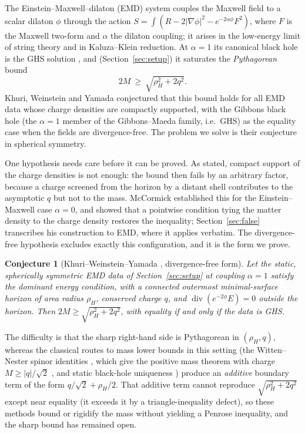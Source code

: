 \documentclass[11pt]{article}
\theoremstyle{plain}
\newtheorem{conjecture}[theorem]{Conjecture}
\theoremstyle{definition}
\newcommand{\rH}{\rho_{\!H}}
\begin{document}
The Einstein--Maxwell--dilaton (EMD) system couples the Maxwell field to a scalar dilaton $\phi$ through the
action $S=\int(R-2|\nabla\phi|^2-e^{-2\alpha\phi}F^2)$, where $F$ is the Maxwell two-form and $\alpha$ the
dilaton coupling; it arises in the low-energy limit of string theory and in Kaluza--Klein reduction. At
$\alpha=1$ its canonical black hole is the GHS solution \cite{GHS,GibbonsMaeda}, and (Section~\ref{sec:setup})
it saturates the \emph{Pythagorean} bound
\begin{equation*}
  2M\ \ge\ \sqrt{\rH^2+2q^2}.
\end{equation*}
Khuri, Weinstein and Yamada \cite[Conjecture 1.7]{KWYext} conjectured that this bound holds for all EMD data
whose charge densities are compactly supported, with the Gibbons black hole \cite{Gibbons82} (the $\alpha=1$
member of the Gibbons--Maeda family, i.e.\ GHS) as the equality case when the fields are divergence-free. The
problem we solve is their conjecture in spherical symmetry.

One hypothesis needs care before it can be proved. As stated, compact support of the charge densities is not
enough: the bound then fails by an arbitrary factor, because a charge screened from the horizon by a distant
shell contributes to the asymptotic $q$ but not to the mass. McCormick \cite[Theorem 3.3]{McCormick}
established this for the Einstein--Maxwell case $\alpha=0$, and showed that a pointwise condition tying the
matter density to the charge density restores the inequality; Section~\ref{sec:false} transcribes his
construction to EMD, where it applies verbatim. The divergence-free hypothesis excludes exactly this
configuration, and it is the form we prove.

\begin{conjecture}[Khuri--Weinstein--Yamada \cite{KWYext}, divergence-free form]\label{conj:posed}
Let the static, spherically symmetric EMD data of Section~\textup{\ref{sec:setup}} at coupling $\alpha=1$
satisfy the dominant energy condition, with a connected outermost minimal-surface horizon of area radius
$\rH$, conserved charge $q$, and $\operatorname{div}(e^{-2\phi}E)=0$ outside the horizon. Then
$2M\ge\sqrt{\rH^2+2q^2}$, with equality if and only if the data is GHS.
\end{conjecture}

The difficulty is that the sharp right-hand side is Pythagorean in $(\rH,q)$, whereas the classical routes to
mass lower bounds in this setting (the Witten--Nester spinor identities \cite{Witten}, which give the positive
mass theorem with charge $M\ge|q|/\sqrt2$ \cite{GKLTT,Nozawa,Rogatko,NozawaShiromizu}, and static black-hole uniqueness
\cite{MarsSimon}) produce an \emph{additive} boundary term of the form $q/\sqrt2+\rH/2$. That additive term
cannot reproduce $\sqrt{\rH^2+2q^2}$ except near equality (it exceeds it by a triangle-inequality defect),
so these methods bound or rigidify the mass without yielding a Penrose inequality, and the sharp bound has
remained open.
\end{document}
